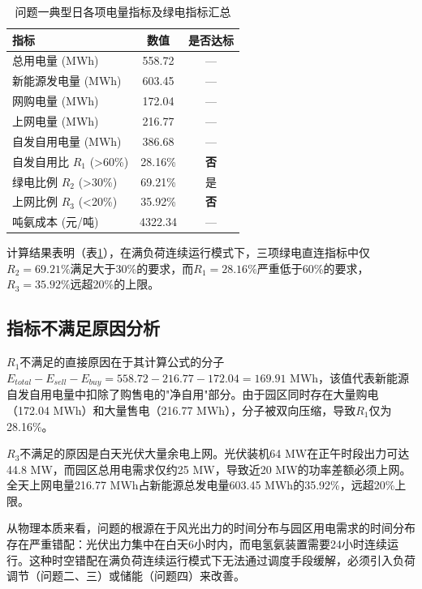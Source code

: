 \begin{table}[H]
\centering
\caption{问题一典型日各项电量指标及绿电指标汇总}
\begin{tabular}{lcc}
\toprule
指标 & 数值 & 是否达标 \\
\midrule
总用电量 (MWh) & 558.72 & — \\
新能源发电量 (MWh) & 603.45 & — \\
网购电量 (MWh) & 172.04 & — \\
上网电量 (MWh) & 216.77 & — \\
自发自用电量 (MWh) & 386.68 & — \\
\midrule
自发自用比 $R_1$ (>60\%) & 28.16\% & \textbf{否} \\
绿电比例 $R_2$ (>30\%) & 69.21\% & 是 \\
上网比例 $R_3$ (<20\%) & 35.92\% & \textbf{否} \\
吨氨成本 (元/吨) & 4322.34 & — \\
\bottomrule
\end{tabular}\label{tab:q1_indicators}
\end{table}

计算结果表明（表\ref{tab:q1_indicators}），在满负荷连续运行模式下，三项绿电直连指标中仅$R_2 = 69.21\%$满足大于30\%的要求，而$R_1 = 28.16\%$严重低于60\%的要求，$R_3 = 35.92\%$远超20\%的上限。

\subsection{指标不满足原因分析}

$R_1$不满足的直接原因在于其计算公式的分子$E_{total} - E_{sell} - E_{buy} = 558.72 - 216.77 - 172.04 = 169.91$ MWh，该值代表新能源自发自用电量中扣除了购售电的"净自用"部分。由于园区同时存在大量购电（172.04 MWh）和大量售电（216.77 MWh），分子被双向压缩，导致$R_1$仅为28.16\%。

$R_3$不满足的原因是白天光伏大量余电上网。光伏装机64 MW在正午时段出力可达44.8 MW，而园区总用电需求仅约25 MW，导致近20 MW的功率差额必须上网。全天上网电量216.77 MWh占新能源总发电量603.45 MWh的35.92\%，远超20\%上限。

从物理本质来看，问题的根源在于风光出力的时间分布与园区用电需求的时间分布存在严重错配：光伏出力集中在白天6小时内，而电氢氨装置需要24小时连续运行。这种时空错配在满负荷连续运行模式下无法通过调度手段缓解，必须引入负荷调节（问题二、三）或储能（问题四）来改善。
